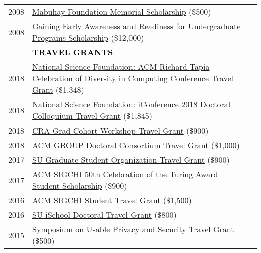 \documentclass[11pt]{article}
\begin{document}
{{\begin{longtable}{Rp{0.75in}p{5.0in}}
\footnotesize{2008} & \href{https://www.facebook.com/MabuhayFoundationinYKMValley}{{Mabuhay Foundation Memorial Scholarship}} (\$500)\\

\footnotesize{2008} & \href{https://www2.ed.gov/programs/gearup/index.html}{{Gaining Early Awareness and Readiness for Undergraduate Programs Scholarship}} (\$12,000)\\

& \textcolor{black}{\uppercase{\textbf{Travel Grants}}}\\

\footnotesize{2018} & \href{https://www.nsf.gov/awardsearch/showAward?AWD_ID=1823052}{{National Science Foundation: ACM Richard Tapia Celebration of Diversity in Computing Conference Travel Grant}} (\$1,348)\\

\footnotesize{2018} & \href{https://www.nsf.gov/awardsearch/showAward?AWD_ID=1713738}{{National Science Foundation: iConference 2018 Doctoral Colloquium Travel Grant}} (\$1,845)\\

\footnotesize{2018} & \href{https://cra.org/events/urmgradcohort/}{{CRA Grad Cohort Workshop Travel Grant}} (\$900)\\

\footnotesize{2018} & \href{https://dl.acm.org/citation.cfm?id=3148330}{{ACM GROUP Doctoral Consortium Travel Grant}} (\$1,000)\\

\footnotesize{2017} & \href{http://gradorg.syr.edu/}{{SU Graduate Student Organization Travel Grant}} (\$900)\\

\footnotesize{2017} & \href{https://sigchi.org/2017/03/sigchi-sponsors-students-to-attend-turing-award-celebration/}{{ACM SIGCHI 50th Celebration of the Turing Award Student Scholarship}} (\$900)\\

\footnotesize{2016} & \href{https://sigchi.org/awards/gary-marsden-travel-awards/sigchi-student-travel-grant/}{{ACM SIGCHI Student Travel Grant}} (\$1,500)\\

\footnotesize{2016} & \href{https://ischool.syr.edu/research/grants-and-awards/}{{SU iSchool Doctoral Travel Grant}} (\$800)\\

\footnotesize{2015} & \href{https://cups.cs.cmu.edu/soups/2015/cfp.php}{{Symposium on Usable Privacy and Security Travel Grant}} (\$500)\\


\end{longtable}}}
\end{document}
